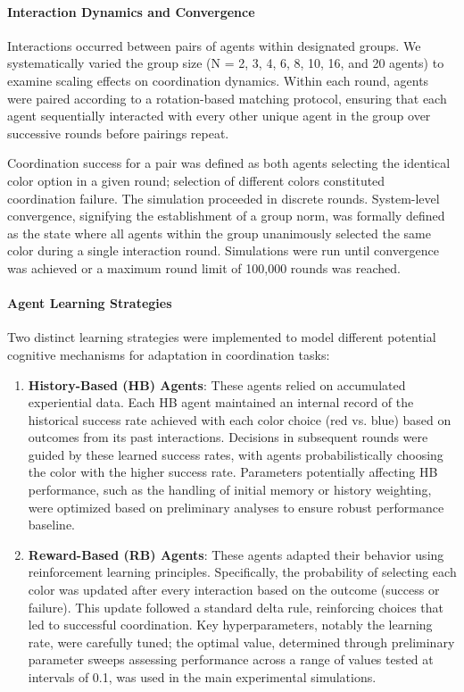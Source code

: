 \documentclass[12pt,a4paper]{article}
\begin{document}
\paragraph{Interaction Dynamics and Convergence}
Interactions occurred between pairs of agents within designated groups. We systematically varied the group size (N = 2, 3, 4, 6, 8, 10, 16, and 20 agents) to examine scaling effects on coordination dynamics. Within each round, agents were paired according to a rotation-based matching protocol, ensuring that each agent sequentially interacted with every other unique agent in the group over successive rounds before pairings repeat.

Coordination success for a pair was defined as both agents selecting the identical color option in a given round; selection of different colors constituted coordination failure. The simulation proceeded in discrete rounds. System-level convergence, signifying the establishment of a group norm, was formally defined as the state where all agents within the group unanimously selected the same color during a single interaction round. Simulations were run until convergence was achieved or a maximum round limit of 100,000 rounds was reached.

\paragraph{Agent Learning Strategies}
Two distinct learning strategies were implemented to model different potential cognitive mechanisms for adaptation in coordination tasks:

\begin{enumerate}
    \item \textbf{History-Based (HB) Agents}: These agents relied on accumulated experiential data. Each HB agent maintained an internal record of the historical success rate achieved with each color choice (red vs. blue) based on outcomes from its past interactions. Decisions in subsequent rounds were guided by these learned success rates, with agents probabilistically choosing the color with the higher success rate. Parameters potentially affecting HB performance, such as the handling of initial memory or history weighting, were optimized based on preliminary analyses to ensure robust performance baseline.
    
    \item \textbf{Reward-Based (RB) Agents}: These agents adapted their behavior using reinforcement learning principles. Specifically, the probability of selecting each color was updated after every interaction based on the outcome (success or failure). This update followed a standard delta rule, reinforcing choices that led to successful coordination. Key hyperparameters, notably the learning rate, were carefully tuned; the optimal value, determined through preliminary parameter sweeps assessing performance across a range of values tested at intervals of 0.1, was used in the main experimental simulations.
\end{enumerate}
\end{document}
